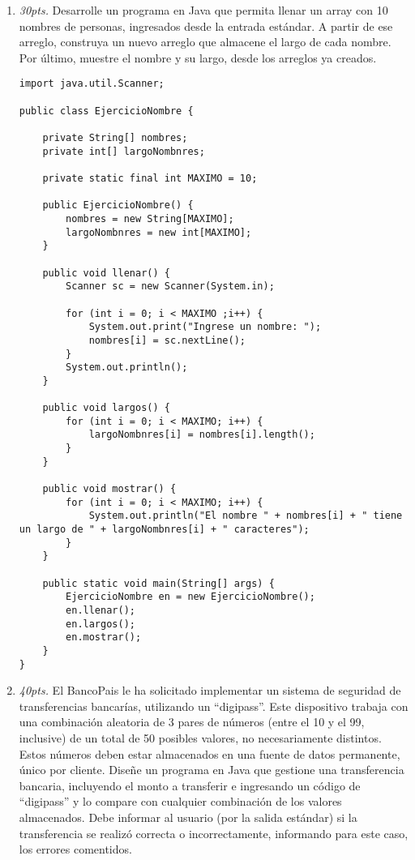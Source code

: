 \documentclass[10pt]{article}
\begin{document}
{\begin{enumerate}
\begin{multicols}{2}
		\end{multicols}

		\newpage

		\item \emph{30pts.} Desarrolle un programa en Java que permita llenar un array con 10 nombres de personas, ingresados desde la entrada est\'andar. A partir de ese arreglo, construya un nuevo arreglo que almacene el largo de cada nombre. Por \'ultimo, muestre el nombre y su largo, desde los arreglos ya creados.
		
\begin{verbatim}
import java.util.Scanner;

public class EjercicioNombre {

    private String[] nombres;
    private int[] largoNombnres;

    private static final int MAXIMO = 10;

    public EjercicioNombre() {
        nombres = new String[MAXIMO];
        largoNombnres = new int[MAXIMO];
    }

    public void llenar() {
        Scanner sc = new Scanner(System.in);

        for (int i = 0; i < MAXIMO ;i++) {
            System.out.print("Ingrese un nombre: ");
            nombres[i] = sc.nextLine();
        }
        System.out.println();
    }

    public void largos() {
        for (int i = 0; i < MAXIMO; i++) {
            largoNombnres[i] = nombres[i].length();
        }
    }

    public void mostrar() {
        for (int i = 0; i < MAXIMO; i++) {
            System.out.println("El nombre " + nombres[i] + " tiene un largo de " + largoNombnres[i] + " caracteres");
        }
    }

    public static void main(String[] args) {
        EjercicioNombre en = new EjercicioNombre();
        en.llenar();
        en.largos();
        en.mostrar();
    }
}
\end{verbatim}        
        
        \newpage

        \item \emph{40pts.} El BancoPais le ha solicitado implementar un sistema de seguridad de transferencias bancar\'ias, utilizando un ``digipass''. Este dispositivo trabaja con una combinaci\'on aleatoria de 3 pares de n\'umeros (entre el 10 y el 99, inclusive) de un total de 50 posibles valores, no necesariamente distintos. Estos n\'umeros deben estar almacenados en una fuente de datos permanente, \'unico por cliente. Dise\~ne un programa en Java que gestione una transferencia bancaria, incluyendo el monto a transferir e ingresando un c\'odigo de ``digipass'' y lo compare con cualquier combinaci\'on de los valores almacenados. Debe informar al usuario (por la salida est\'andar) si la transferencia se realiz\'o correcta o incorrectamente, informando para este caso, los errores comentidos.


\end{enumerate}}
\end{document}
